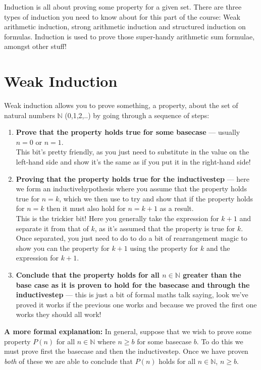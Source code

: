 Induction is all about proving some property for a given set. There are three types of induction you need to know about for this part of the course: Weak arithmetic induction, strong arithmetic induction and structured induction on formulas. Induction is used to prove those super-handy arithmetic sum formulae, amongst other stuff!

\section{Weak Induction}

Weak induction allows you to prove something, a property, about the set of natural numbers $\mathbb{N}$ (0,1,2,..) by going through a sequence of steps:

\begin{enumerate}
  \item {\bf Prove that the property holds true for some \gls{basecase}} --- usually $n=0$ or $n=1$. \\

  This bit's pretty friendly, as you just need to substitute in the value on the left-hand side and show it's the same as if you put it in the right-hand side!
  \item {\bf Proving that the property holds true for the \gls{inductivestep}} --- here we form an \gls{inductivehypothesis} where you assume that the property holds true for $n=k$, which we then use to try and show that if the property holds for $n=k$ then it must also hold for $n=k+1$ as a result. \\

  This is the trickier bit! Here you generally take the expression for $k+1$ and separate it from that of $k$, as it's assumed that the property is true for $k$. Once separated, you just need to do to do a bit of rearrangement magic to show you can the property for $k+1$ using the property for $k$ and the expression for $k+1$.
  \item {\bf Conclude that the property holds for all $n\in\mathbb{N}$ greater than the base case as it is proven to hold for the \gls{basecase} and through the \gls{inductivestep}} --- this is just a bit of formal maths talk saying, look we've proved it works if the previous one works and because we proved the first one works they should all work!
\end{enumerate}

\noindent
{\bf A more formal explanation:} In general, suppose that we wish to prove some property $P(n)$ for all $n\in\mathbb{N}$ where $n\ge b$ for some \gls{basecase} $b$. To do this we must prove first the \gls{basecase} and then the \gls{inductivestep}. Once we have proven \emph{both} of these we are able to conclude that $P(n)$ holds for all $n\in\mathbb{N}$, $n\ge b$.

